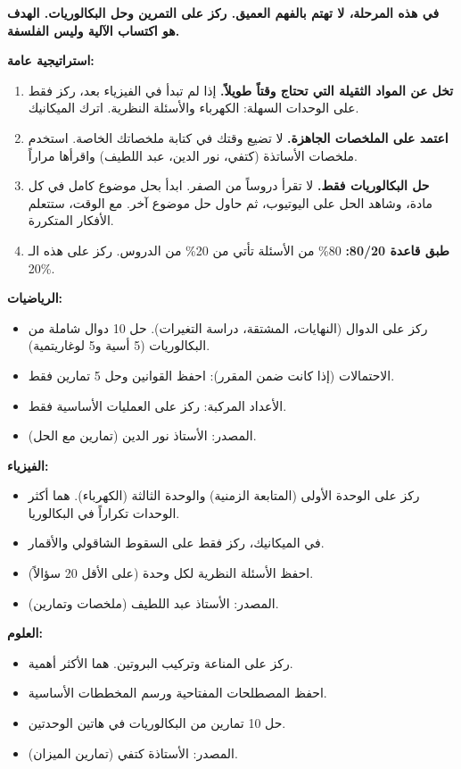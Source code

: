 \documentclass[12pt,a4paper]{book}
\newcommand{\importantAr}[1]{%
	\begin{important}
		\bfseries #1
	\end{important}
}
\begin{document}
	\importantAr{في هذه المرحلة، لا تهتم بالفهم العميق. ركز على التمرين وحل البكالوريات. الهدف هو اكتساب الآلية وليس الفلسفة.}
	
	\textbf{استراتيجية عامة:}
	\begin{enumerate}
		\item \textbf{تخل عن المواد الثقيلة التي تحتاج وقتاً طويلاً.} إذا لم تبدأ في الفيزياء بعد، ركز فقط على الوحدات السهلة: الكهرباء  والأسئلة النظرية. اترك الميكانيك.
		\item \textbf{اعتمد على الملخصات الجاهزة.} لا تضيع وقتك في كتابة ملخصاتك الخاصة. استخدم ملخصات الأساتذة (كتفي، نور الدين، عبد اللطيف) واقرأها مراراً.
		\item \textbf{حل البكالوريات فقط.} لا تقرأ دروساً من الصفر. ابدأ بحل موضوع كامل في كل مادة، وشاهد الحل على اليوتيوب، ثم حاول حل موضوع آخر. مع الوقت، ستتعلم الأفكار المتكررة.
		\item \textbf{طبق قاعدة 80/20:} 80\% من الأسئلة تأتي من 20\% من الدروس. ركز على هذه الـ 20\%.
	\end{enumerate}
	
	\textbf{الرياضيات:}
	\begin{itemize}
		\item ركز على الدوال (النهايات، المشتقة، دراسة التغيرات). حل 10 دوال شاملة من البكالوريات (5 أسية و5 لوغاريتمية).
		\item الاحتمالات (إذا كانت ضمن المقرر): احفظ القوانين وحل 5 تمارين فقط.
		\item الأعداد المركبة: ركز على العمليات الأساسية فقط.
		\item المصدر: الأستاذ نور الدين (تمارين مع الحل).
	\end{itemize}
	
	\textbf{الفيزياء:}
	\begin{itemize}
		\item ركز على الوحدة الأولى (المتابعة الزمنية) والوحدة الثالثة (الكهرباء). هما أكثر الوحدات تكراراً في البكالوريا.
		\item في الميكانيك، ركز فقط على السقوط الشاقولي والأقمار.
		\item احفظ الأسئلة النظرية لكل وحدة (على الأقل 20 سؤالاً).
		\item المصدر: الأستاذ عبد اللطيف (ملخصات وتمارين).
	\end{itemize}
	
	\textbf{العلوم:}
	\begin{itemize}
		\item ركز على المناعة وتركيب البروتين. هما الأكثر أهمية.
		\item احفظ المصطلحات المفتاحية ورسم المخططات الأساسية.
		\item حل 10 تمارين من البكالوريات في هاتين الوحدتين.
		\item المصدر: الأستاذة كتفي (تمارين الميزان).
	\end{itemize}
	
\end{document}
